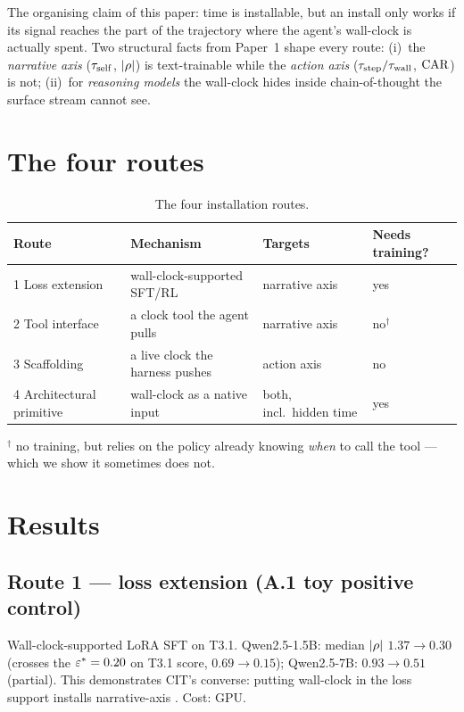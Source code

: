 \documentclass[11pt]{article}
\begin{document}
The organising claim of this paper: time is installable, but an install only
works if its signal reaches the part of the trajectory where the agent's
wall-clock is actually spent. Two structural facts from Paper~1 shape every
route: (i)~the \emph{narrative axis} ($\tau_{\mathrm{self}}$, $|\rho|$) is text-trainable
while the \emph{action axis} ($\tau_{\mathrm{step}}/\tau_{\mathrm{wall}}$, $\mathrm{CAR}$) is not; (ii)~for
\emph{reasoning models} the wall-clock hides inside chain-of-thought the surface
stream cannot see.

\section{The four routes}

\begin{table}[h]
\centering
\small
\caption{The four \ChronoStack{} installation routes.}
\begin{tabular}{llll}
\toprule
Route & Mechanism & Targets & Needs training? \\
\midrule
1 Loss extension & wall-clock-supported SFT/RL & narrative axis & yes \\
2 Tool interface & a clock tool the agent pulls & narrative axis & no$^{\dagger}$ \\
3 Scaffolding & a live clock the harness pushes & action axis & no \\
4 Architectural primitive & wall-clock as a native input & both, incl.\ hidden time & yes \\
\bottomrule
\end{tabular}
\end{table}
{\footnotesize $^{\dagger}$ no training, but relies on the policy already knowing
\emph{when} to call the tool --- which we show it sometimes does not.}

\section{Results}

\subsection{Route 1 --- loss extension (A.1 toy positive control)}
Wall-clock-supported LoRA SFT on T3.1. Qwen2.5-1.5B: median $|\rho|$
$1.37 \to 0.30$ (crosses the \AugustineThreshold{} $\varepsilon^{*}=0.20$ on T3.1
score, $0.69 \to 0.15$); Qwen2.5-7B: $0.93 \to 0.51$ (partial). This demonstrates
CIT's converse: putting wall-clock in the loss support installs narrative-axis
\chrono{}. Cost: GPU.
\end{document}
